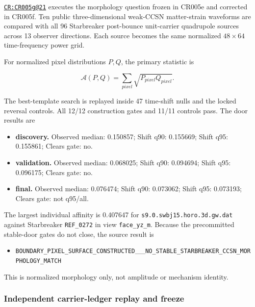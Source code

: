 \href{https://github.com/iwtbotiwtwot/SAMA/blob/4c2b5dc1649da5900c90b90d0ce56c223dbb7717/tests/courtroom/21-gravitational-waves-cr005g-starbreaker-weak-ccsn-pixel-bridge-inventory-corrected/README.md}{\texttt{CR:CR005g@21}}
executes the morphology question frozen in CR005e and corrected in
CR005f. Ten public three-dimensional weak-CCSN matter-strain waveforms
are compared with all 96 Starbreaker post-bounce unit-carrier quadrupole
sources across 13 observer directions. Each source becomes the same
normalized \(48\times64\) time-frequency power grid.

For normalized pixel distributions \(P,Q\), the primary statistic is

\[
\mathcal A(P,Q)=\sum_{pixel}\sqrt{P_{pixel}Q_{pixel}}.
\]

The best-template search is replayed inside 47 time-shift nulls and the
locked reversal controls. All 12/12 construction gates and 11/11
controls pass. The door results are

\begin{itemize}
\tightlist
\item
  \textbf{discovery.} Observed median: 0.150857; Shift q90: 0.155669;
  Shift q95: 0.155861; Clears gate: no.
\item
  \textbf{validation.} Observed median: 0.068025; Shift q90: 0.094694;
  Shift q95: 0.096175; Clears gate: no.
\item
  \textbf{final.} Observed median: 0.076474; Shift q90: 0.073062; Shift
  q95: 0.073193; Clears gate: not q95/all.
\end{itemize}

The largest individual affinity is 0.407647 for
\nolinkurl{s9.0.swbj15.horo.3d.gw.dat} against Starbreaker
\texttt{REF\_0272} in view \texttt{face\_yz\_m}. Because the
precommitted stable-door gates do not close, the source result is

\begin{itemize}
\tightlist
\item
  \nolinkurl{BOUNDARY_PIXEL_SURFACE_CONSTRUCTED}\_\_\nolinkurl{NO_STABLE_STARBREAKER_CCSN_MORPHOLOGY_MATCH}
\end{itemize}

This is normalized morphology only, not amplitude or mechanism identity.

\subsubsection{Independent carrier-ledger replay and
freeze}\label{viii-ch08-independent-carrier-ledger-replay-and-freeze}

